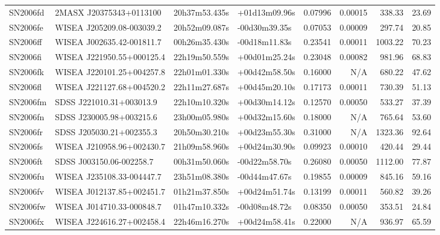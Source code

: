 \begin{longtable}{llllrrrr}
SN2006fd         &         2MASX J20375343+0113100 &   20h37m53.435s &   +01d13m09.96s &  0.07996 &  0.00015 &   338.33 &       23.69 \\
SN2006fe         &       WISEA J205209.08-003039.2 &   20h52m09.087s &   -00d30m39.35s &  0.07053 &  0.00009 &   297.74 &       20.85 \\
SN2006ff         &       WISEA J002635.42-001811.7 &   00h26m35.430s &   -00d18m11.83s &  0.23541 &  0.00011 &  1003.22 &       70.23 \\
SN2006fi         &       WISEA J221950.55+000125.4 &   22h19m50.559s &   +00d01m25.24s &  0.23048 &  0.00082 &   981.96 &       68.83 \\
SN2006fk         &       WISEA J220101.25+004257.8 &   22h01m01.330s &   +00d42m58.50s &  0.16000 &      N/A &   680.22 &       47.62 \\
SN2006fl         &       WISEA J221127.68+004520.2 &   22h11m27.687s &   +00d45m20.10s &  0.17173 &  0.00011 &   730.39 &       51.13 \\
SN2006fm         &        SDSS J221010.31+003013.9 &   22h10m10.320s &   +00d30m14.12s &  0.12570 &  0.00050 &   533.27 &       37.39 \\
SN2006fn         &        SDSS J230005.98+003215.6 &   23h00m05.980s &   +00d32m15.60s &  0.18000 &      N/A &   765.64 &       53.60 \\
SN2006fr         &        SDSS J205030.21+002355.3 &   20h50m30.210s &   +00d23m55.30s &  0.31000 &      N/A &  1323.36 &       92.64 \\
SN2006fs         &       WISEA J210958.96+002430.7 &   21h09m58.960s &   +00d24m30.90s &  0.09923 &  0.00010 &   420.44 &       29.44 \\
SN2006ft         &        SDSS J003150.06-002258.7 &   00h31m50.060s &   -00d22m58.70s &  0.26080 &  0.00050 &  1112.00 &       77.87 \\
SN2006fu         &       WISEA J235108.33-004447.7 &   23h51m08.380s &   -00d44m47.67s &  0.19855 &  0.00009 &   845.16 &       59.16 \\
SN2006fv         &       WISEA J012137.85+002451.7 &   01h21m37.850s &   +00d24m51.74s &  0.13199 &  0.00011 &   560.82 &       39.26 \\
SN2006fw         &       WISEA J014710.33-000848.7 &   01h47m10.332s &   -00d08m48.72s &  0.08350 &  0.00050 &   353.51 &       24.84 \\
SN2006fx         &       WISEA J224616.27+002458.4 &   22h46m16.270s &   +00d24m58.41s &  0.22000 &      N/A &   936.97 &       65.59 \\

\end{longtable}
